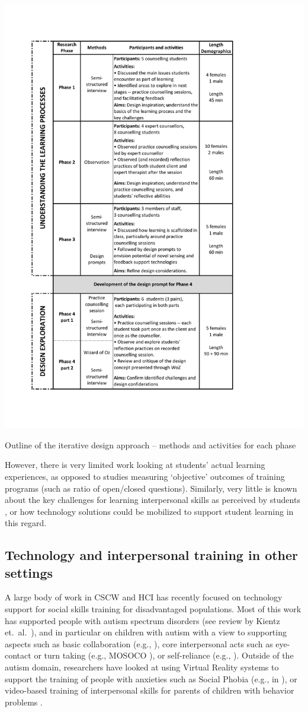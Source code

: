 \documentclass{sigchi}
\begin{document}
\begin{table}[t]
	\centering
	\includegraphics[width=.85\columnwidth]{images/Method-table.pdf}
	\caption{Outline of the iterative design approach -- methods and activities for each phase}
	\label{fig:MethodsOutline}
\end{table}

However, there is very limited work looking at students' actual learning experiences, as opposed to studies measuring `objective' outcomes of training programs (such as ratio of open/closed questions). Similarly, very little is known about the key challenges for learning interpersonal skills as perceived by students \cite{Bulpitt2005,Hill2007a}, or how technology solutions could be mobilized to support student learning in this regard. 


\subsection{Technology and interpersonal training in other settings}
A large body of work in CSCW and HCI has recently focused on technology support for social skills training for disadvantaged populations. Most of this work has supported people with autism spectrum disorders (see review by Kientz et.~al.~\cite{Kientz2013}), and in particular on children with autism with a view to supporting aspects such as basic collaboration (e.g., \cite{Piper2006}), core interpersonal acts such as eye-contact or turn taking (e.g., MOSOCO \cite{Escobedo2012}), or self-reliance (e.g., \cite{Hong2012}). Outside of the autism domain, researchers have looked at using Virtual Reality systems to support the training of people with anxieties such as Social Phobia (e.g., in \cite{Klinger2005}), or video-based training of interpersonal skills for parents of children with behavior problems \cite{Kennedy2011}. 
\end{document}
